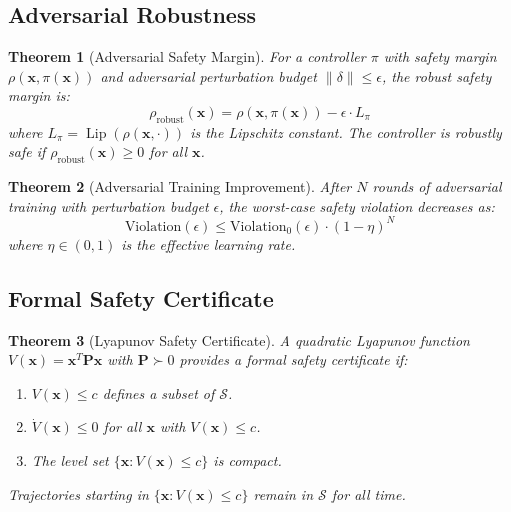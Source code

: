 \documentclass[12pt,a4paper,twocolumn]{article}
\newcommand{\cS}{\mathcal{S}}
\newcommand{\vect}[1]{\mathbf{#1}}
\newcommand{\mat}[1]{\mathbf{#1}}
\DeclareMathOperator{\Lip}{Lip}
\newtheorem{theorem}{Theorem}[section]
\begin{document}
\subsection{Adversarial Robustness}

\begin{theorem}[Adversarial Safety Margin]
\label{thm:adversarial}
For a controller $\pi$ with safety margin $\rho(\vect{x}, \pi(\vect{x}))$ and adversarial perturbation budget $\|\delta\| \leq \epsilon$, the robust safety margin is:
\begin{equation}
    \rho_{\text{robust}}(\vect{x}) = \rho(\vect{x}, \pi(\vect{x})) - \epsilon \cdot L_\pi
\end{equation}
where $L_\pi = \Lip(\rho(\vect{x}, \cdot))$ is the Lipschitz constant. The controller is robustly safe if $\rho_{\text{robust}}(\vect{x}) \geq 0$ for all $\vect{x}$.
\end{theorem}

\begin{theorem}[Adversarial Training Improvement]
\label{thm:adv_train}
After $N$ rounds of adversarial training with perturbation budget $\epsilon$, the worst-case safety violation decreases as:
\begin{equation}
    \text{Violation}(\epsilon) \leq \text{Violation}_0(\epsilon) \cdot (1 - \eta)^N
\end{equation}
where $\eta \in (0, 1)$ is the effective learning rate.
\end{theorem}

\subsection{Formal Safety Certificate}

\begin{theorem}[Lyapunov Safety Certificate]
\label{thm:lyapunov}
A quadratic Lyapunov function $V(\vect{x}) = \vect{x}^T \mat{P} \vect{x}$ with $\mat{P} \succ 0$ provides a formal safety certificate if:
\begin{enumerate}[leftmargin=*]
    \item $V(\vect{x}) \leq c$ defines a subset of $\cS$.
    \item $\dot{V}(\vect{x}) \leq 0$ for all $\vect{x}$ with $V(\vect{x}) \leq c$.
    \item The level set $\{\vect{x} : V(\vect{x}) \leq c\}$ is compact.
\end{enumerate}
Trajectories starting in $\{\vect{x} : V(\vect{x}) \leq c\}$ remain in $\cS$ for all time.
\end{theorem}
\end{document}
